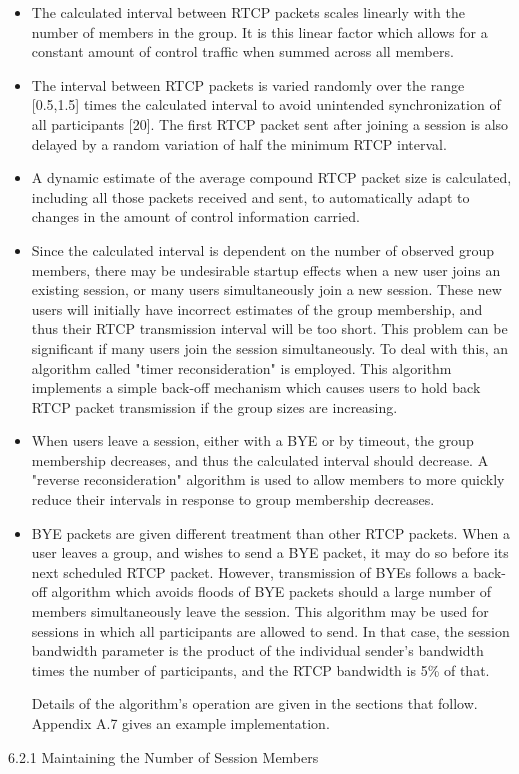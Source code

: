 \documentclass{article}
\begin{document}
\begin{itemize}
\item The calculated interval between RTCP packets scales linearly with the number of members in the group.  It is this linear factor which allows for a constant amount of control traffic when summed across all members.
\item The interval between RTCP packets is varied randomly over the range [0.5,1.5] times the calculated interval to avoid unintended synchronization of all participants [20].  The first RTCP packet sent after joining a session is also delayed by a random variation of half the minimum RTCP interval.
\item A dynamic estimate of the average compound RTCP packet size is calculated, including all those packets received and sent, to automatically adapt to changes in the amount of control information carried.
\item Since the calculated interval is dependent on the number of observed group members, there may be undesirable startup effects when a new user joins an existing session, or many users simultaneously join a new session.  These new users will initially have incorrect estimates of the group membership, and thus their RTCP transmission interval will be too short.  This problem can be significant if many users join the session simultaneously.  To deal with this, an algorithm called "timer reconsideration" is employed.  This algorithm implements a simple back-off mechanism which causes users to hold back RTCP packet transmission if the group sizes are increasing.
\item When users leave a session, either with a BYE or by timeout, the group membership decreases, and thus the calculated interval should decrease.  A "reverse reconsideration" algorithm is used to allow members to more quickly reduce their intervals in response to group membership decreases.
\item BYE packets are given different treatment than other RTCP packets. When a user leaves a group, and wishes to send a BYE packet, it may do so before its next scheduled RTCP packet.  However, transmission of BYEs follows a back-off algorithm which avoids floods of BYE packets should a large number of members simultaneously leave the session.
This algorithm may be used for sessions in which all participants are allowed to send.  In that case, the session bandwidth parameter is the product of the individual sender's bandwidth times the number of participants, and the RTCP bandwidth is 5\% of that.

Details of the algorithm's operation are given in the sections that follow.  Appendix A.7 gives an example implementation.

\end{itemize}
6.2.1 Maintaining the Number of Session Members
\end{document}
